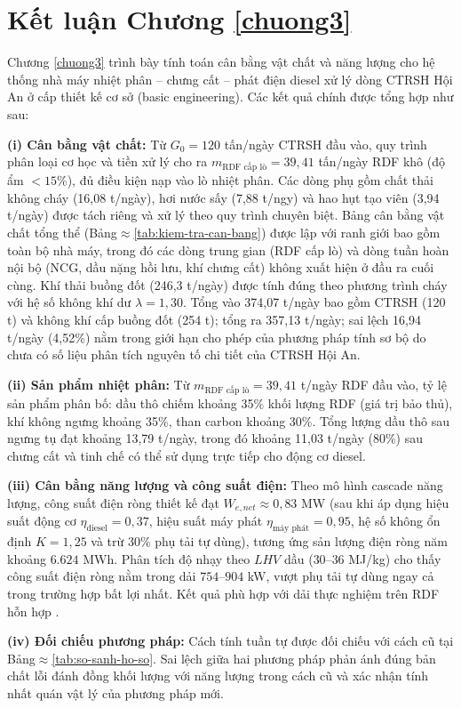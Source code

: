 \documentclass[../main.tex]{subfiles}
\begin{document}
\section*{Kết luận Chương \ref{chuong3}}

Chương \ref{chuong3} trình bày tính toán cân bằng vật chất và năng lượng cho hệ thống nhà máy nhiệt phân -- chưng cất -- phát điện diesel xử lý dòng CTRSH Hội An ở cấp thiết kế cơ sở (basic engineering). Các kết quả chính được tổng hợp như sau:

\textbf{(i) Cân bằng vật chất:} Từ $G_0 = 120$ tấn/ngày CTRSH đầu vào, quy trình phân loại cơ học và tiền xử lý cho ra $m_{\text{RDF cấp lò}} = 39{,}41$ tấn/ngày RDF khô (độ ẩm $<15\%$), đủ điều kiện nạp vào lò nhiệt phân. Các dòng phụ gồm chất thải không cháy (16,08 t/ngày), hơi nước sấy (7,88 t/ngy) và hao hụt tạo viên (3,94 t/ngày) được tách riêng và xử lý theo quy trình chuyên biệt. Bảng cân bằng vật chất tổng thể (Bảng$\approx$\ref{tab:kiem-tra-can-bang}) được lập với ranh giới bao gồm toàn bộ nhà máy, trong đó các dòng trung gian (RDF cấp lò) và dòng tuần hoàn nội bộ (NCG, dầu nặng hồi lưu, khí chưng cất) không xuất hiện ở đầu ra cuối cùng. Khí thải buồng đốt (246,3 t/ngày) được tính đúng theo phương trình cháy với hệ số không khí dư $\lambda = 1{,}30$. Tổng vào 374,07 t/ngày bao gồm CTRSH (120 t) và không khí cấp buồng đốt (254 t); tổng ra 357,13 t/ngày; sai lệch 16,94 t/ngày (4,52\%) nằm trong giới hạn cho phép của phương pháp tính sơ bộ do chưa có số liệu phân tích nguyên tố chi tiết của CTRSH Hội An.

\textbf{(ii) Sản phẩm nhiệt phân:} Từ $m_{\text{RDF cấp lò}} = 39{,}41$ t/ngày RDF đầu vào, tỷ lệ sản phẩm phân bố: dầu thô chiếm khoảng 35\% khối lượng RDF (giá trị bảo thủ), khí không ngưng khoảng 35\%, than carbon khoảng 30\%. Tổng lượng dầu thô sau ngưng tụ đạt khoảng 13,79 t/ngày, trong đó khoảng 11,03 t/ngày (80\%) sau chưng cất và tinh chế có thể sử dụng trực tiếp cho động cơ diesel.

\textbf{(iii) Cân bằng năng lượng và công suất điện:} Theo mô hình cascade năng lượng, công suất điện ròng thiết kế đạt $W_{e,net} \approx 0{,}83$ MW (sau khi áp dụng hiệu suất động cơ $\eta_{\text{diesel}}=0{,}37$, hiệu suất máy phát $\eta_{\text{máy phát}}=0{,}95$, hệ số không ổn định $K=1{,}25$ và trừ $30\%$ phụ tải tự dùng), tương ứng sản lượng điện ròng năm khoảng $6.624$ MWh. Phân tích độ nhạy theo $LHV$ dầu ($30$--$36$ MJ/kg) cho thấy công suất điện ròng nằm trong dải $754$--$904$ kW, vượt phụ tải tự dùng ngay cả trong trường hợp bất lợi nhất. Kết quả phù hợp với dải thực nghiệm trên RDF hỗn hợp \cite{Sharuddin2016,Williams2007}.

\textbf{(iv) Đối chiếu phương pháp:} Cách tính tuần tự được đối chiếu với cách cũ tại Bảng$\approx$\ref{tab:so-sanh-ho-so}. Sai lệch giữa hai phương pháp phản ánh đúng bản chất lỗi đánh đồng khối lượng với năng lượng trong cách cũ và xác nhận tính nhất quán vật lý của phương pháp mới.
\end{document}

